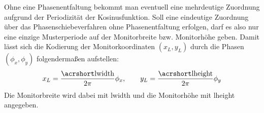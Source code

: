 Ohne eine Phasenentfaltung bekommt man eventuell eine mehrdeutige Zuordnung aufgrund der Periodizität der Kosinusfunktion.
Soll eine eindeutige Zuordnung über das Phasenschiebeverfahren ohne Phasenentfaltung erfolgen, darf es also nur eine einzige Musterperiode auf der Monitorbreite bzw. Monitorhöhe geben.
Damit lässt sich die Kodierung der Monitorkoordinaten $(x_{L}, y_{L})$ durch die Phasen $(\phi_{x}, \phi_{y})$ folgendermaßen aufstellen:
\begin{equation}\label{eq:phasenkodierung}
	x_{L} = \dfrac{\acrshortmath{lwidth}}{2\pi}\phi_{x},
	\qquad
	y_{L} = \dfrac{\acrshortmath{lheight}}{2\pi}\phi_{y}
\end{equation}
%
\noindent
Die Monitorbreite wird dabei mit \acrshort{lwidth} und die Monitorhöhe mit \acrshort{lheight} angegeben.

